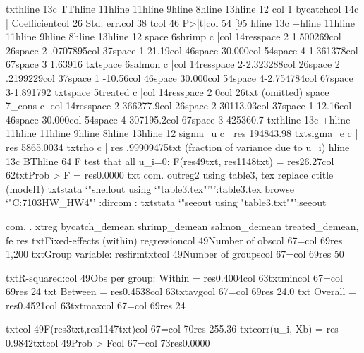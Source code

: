{txt}{hline 13}{c TT}{hline 11}{hline 11}{hline 9}{hline 8}{hline 13}{hline 12}
{col 1}     bycatch{col 14}{c |} Coefficient{col 26}  Std. err.{col 38}      t{col 46}   P>|t|{col 54}     [95%
{hline 13}{c +}{hline 11}{hline 11}{hline 9}{hline 8}{hline 13}{hline 12}
{space 6}shrimp {c |}{col 14}{res}{space 2} 1.500269{col 26}{space 2} .0707895{col 37}{space 1}   21.19{col 46}{space 3}0.000{col 54}{space 4} 1.361378{col 67}{space 3}  1.63916
{txt}{space 6}salmon {c |}{col 14}{res}{space 2}-2.323288{col 26}{space 2} .2199229{col 37}{space 1}  -10.56{col 46}{space 3}0.000{col 54}{space 4}-2.754784{col 67}{space 3}-1.891792
{txt}{space 5}treated {c |}{col 14}{res}{space 2}        0{col 26}{txt}  (omitted)
{space 7}_cons {c |}{col 14}{res}{space 2} 366277.9{col 26}{space 2} 30113.03{col 37}{space 1}   12.16{col 46}{space 3}0.000{col 54}{space 4} 307195.2{col 67}{space 3} 425360.7
{txt}{hline 13}{c +}{hline 11}{hline 11}{hline 9}{hline 8}{hline 13}{hline 12}
     sigma_u {c |} {res} 194843.98
     {txt}sigma_e {c |} {res} 5865.0034
         {txt}rho {c |} {res} .99909475{txt}   (fraction of variance due to u_i)
{hline 13}{c BT}{hline 64}
F test that all u_i=0: F({res}49{txt}, {res}1148{txt}) = {res}26.27{col 62}{txt}Prob > F = {res}0.0000
{txt}
{com}. outreg2 using table3, tex replace ctitle (model1)
{txt}{stata `"shellout using `"table3.tex"'"':table3.tex}
{browse `"C:\Users\sedat\OneDrive{}\ECON7103HW_HW4"' :dir}{com} : {txt}{stata `"seeout using "table3.txt""':seeout}

{com}. 
. xtreg bycatch_demean shrimp_demean salmon_demean treated_demean, fe
{res}
{txt}Fixed-effects (within) regression{col 49}Number of obs{col 67}={col 69}{res}     1,200
{txt}Group variable: {res}firm{txt}{col 49}Number of groups{col 67}={col 69}{res}        50

{txt}R-squared:{col 49}Obs per group:
     Within  = {res}0.4004{col 63}{txt}min{col 67}={col 69}{res}        24
{txt}     Between = {res}0.4538{col 63}{txt}avg{col 67}={col 69}{res}      24.0
{txt}     Overall = {res}0.4521{col 63}{txt}max{col 67}={col 69}{res}        24

{txt}{col 49}F({res}3{txt},{res}1147{txt}){col 67}={col 70}{res}   255.36
{txt}corr(u_i, Xb) = {res}-0.9842{txt}{col 49}Prob > F{col 67}={col 73}{res}0.0000

